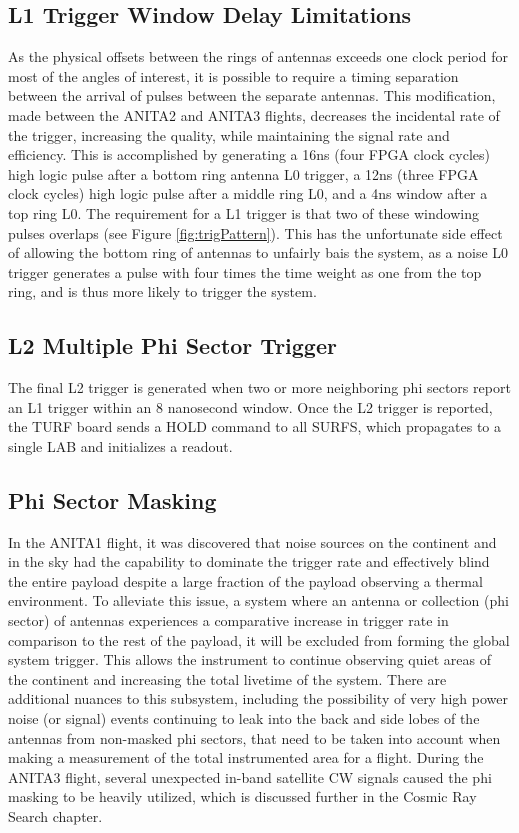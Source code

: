 	\subsection{L1 Trigger Window Delay Limitations}
		As the physical offsets between the rings of antennas exceeds one clock period for most of the angles of interest, it is possible to require a timing separation between the arrival of pulses between the separate antennas.  This modification, made between the ANITA2 and ANITA3 flights, decreases the incidental rate of the trigger, increasing the quality, while maintaining the signal rate and efficiency.  This is accomplished by generating a 16ns (four FPGA clock cycles) high logic pulse after a bottom ring antenna L0 trigger, a 12ns (three FPGA clock cycles) high logic pulse after a middle ring L0, and a 4ns window after a top ring L0.  The requirement for a L1 trigger is that two of these windowing pulses overlaps (see Figure \ref{fig:trigPattern}).  This has the unfortunate side effect of allowing the bottom ring of antennas to unfairly bais the system, as a noise L0 trigger generates a pulse with four times the time weight as one from the top ring, and is thus more likely to trigger the system.
		
	\subsection{L2 Multiple Phi Sector Trigger}
		The final L2 trigger is generated when two or more neighboring phi sectors report an L1 trigger within an 8 nanosecond window.  Once the L2 trigger is reported, the TURF board sends a HOLD command to all SURFS, which propagates to a single LAB and initializes a readout.

	\subsection{Phi Sector Masking}
		In the ANITA1 flight, it was discovered that noise sources on the continent and in the sky had the capability to dominate the trigger rate and effectively blind the entire payload despite a large fraction of the payload observing a thermal environment. To alleviate this issue, a system where an antenna or collection (phi sector) of antennas experiences a comparative increase in trigger rate in comparison to the rest of the payload, it will be excluded from forming the global system trigger.  This allows the instrument to continue observing quiet areas of the continent and increasing the total livetime of the system.  There are additional nuances to this subsystem, including the possibility of very high power noise (or signal) events continuing to leak into the back and side lobes of the antennas from non-masked phi sectors, that need to be taken into account when making a measurement of the total instrumented area for a flight.  During the ANITA3 flight, several unexpected in-band satellite CW signals caused the phi masking to be heavily utilized, which is discussed further in the Cosmic Ray Search chapter.
		
